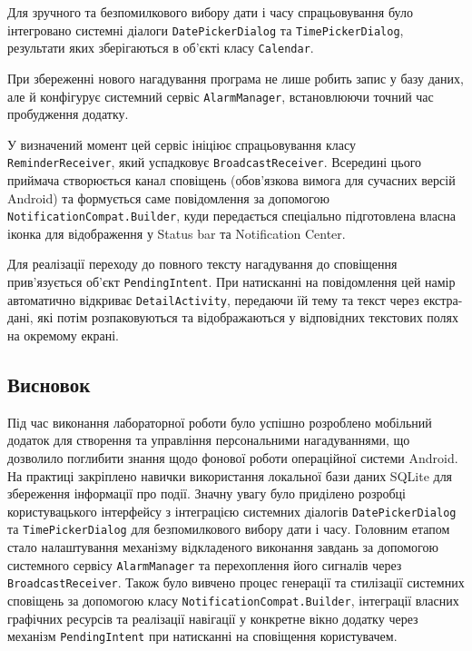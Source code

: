 \documentclass[14pt, a4paper]{extreport}
\begin{document}
	Для зручного та безпомилкового вибору дати і часу спрацьовування було інтегровано системні діалоги \texttt{DatePickerDialog} та \texttt{TimePickerDialog}, результати яких зберігаються в об'єкті класу \texttt{Calendar}. 
	
	
	При збереженні нового нагадування програма не лише робить запис у базу даних, але й конфігурує системний сервіс \texttt{AlarmManager}, встановлюючи точний час пробудження додатку. 
	
	
	У визначений момент цей сервіс ініціює спрацьовування класу \texttt{ReminderReceiver}, який успадковує \texttt{BroadcastReceiver}. Всередині цього приймача створюється канал сповіщень (обов'язкова вимога для сучасних версій Android) та формується саме повідомлення за допомогою \texttt{NotificationCompat.Builder}, куди передається спеціально підготовлена власна іконка для відображення у Status bar та Notification Center. 
	
	
	Для реалізації переходу до повного тексту нагадування до сповіщення прив'язується об'єкт \texttt{PendingIntent}. При натисканні на повідомлення цей намір автоматично відкриває \texttt{DetailActivity}, передаючи їй тему та текст через екстра-дані, які потім розпаковуються та відображаються у відповідних текстових полях на окремому екрані.
	
	\subsection*{Висновок}
	
	Під час виконання лабораторної роботи було успішно розроблено мобільний додаток для створення та управління персональними нагадуваннями, що дозволило поглибити знання щодо фонової роботи операційної системи Android. На практиці закріплено навички використання локальної бази даних SQLite для збереження інформації про події. Значну увагу було приділено розробці користувацького інтерфейсу з інтеграцією системних діалогів \texttt{DatePickerDialog} та \texttt{TimePickerDialog} для безпомилкового вибору дати і часу. Головним етапом стало налаштування механізму відкладеного виконання завдань за допомогою системного сервісу \texttt{AlarmManager} та перехоплення його сигналів через \texttt{BroadcastReceiver}. Також було вивчено процес генерації та стилізації системних сповіщень за допомогою класу \texttt{NotificationCompat.Builder}, інтеграції власних графічних ресурсів та реалізації навігації у конкретне вікно додатку через механізм \texttt{PendingIntent} при натисканні на сповіщення користувачем.
	
\end{document}

